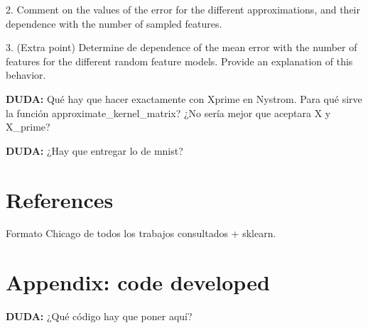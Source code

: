 \documentclass[11pt]{article}
\begin{document}
2. Comment on the values of the error for the different approximations, and their dependence with the number of sampled features.

3. (Extra point) Determine de dependence of the mean error with the number of features for the different random feature models. Provide an explanation of this behavior.

\textbf{DUDA:} Qué hay que hacer exactamente con Xprime en Nystrom. Para qué sirve la función approximate\_kernel\_matrix? ¿No sería mejor que aceptara X y X\_prime?

\textbf{DUDA:} ¿Hay que entregar lo de mnist?

\section*{References}

Formato Chicago de todos los trabajos consultados + sklearn.

\section*{Appendix: code developed}

\textbf{DUDA:} ¿Qué código hay que poner aquí?
\end{document}
